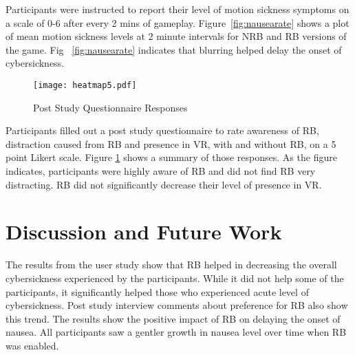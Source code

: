 \documentclass{vgtc}                          %
\begin{document}
Participants were instructed to report their level of motion sickness symptoms on a scale of 0-6 after every 2 mins of gameplay. Figure~\ref{fig:nausearate} shows a plot of mean motion sickness levels at 2 minute intervals for NRB and RB versions of the game. Fig ~\ref{fig:nausearate} indicates that blurring helped delay the onset of cybersickness.

\begin{figure}[h]
\vspace{-8pt}
	\centering
	\texttt{[image: heatmap5.pdf]}
	\caption{ Post Study Questionnaire Responses \vspace{-8pt}}
	\label{fig:questionnaire}
	\vspace{-8pt}
\end{figure}

Participants filled out a post study questionnaire to rate awareness of RB, distraction caused from RB and presence in VR, with and without RB, on a 5 point Likert scale. Figure \ref{fig:questionnaire} shows a summary of those responses. As the figure indicates, participants were highly aware of RB and did not find RB very distracting. RB did not significantly decrease their level of presence in VR.


\section {Discussion and Future Work}

The results from the user study show that RB helped in decreasing the overall cybersickness experienced by the participants. While it did not help some of the participants, it significantly helped those who experienced acute level of cybersickness. Post study interview comments about preference for RB also show this trend. The results show the positive impact of RB on delaying the onset of nausea. All participants saw a gentler growth in nausea level over time when RB was enabled.

\end{document}
